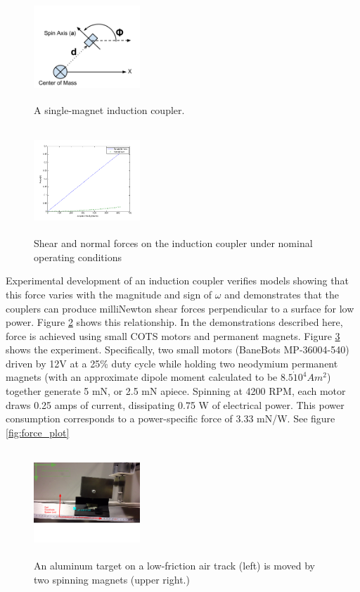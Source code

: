 \documentclass{article}
\begin{document}
\begin{figure}\label{fig:min_array_diagram}
\includegraphics[width = 4cm, height = 4cm ]{figures/minimum_array.png}

\caption{A single-magnet induction coupler.}
\end{figure}

\begin{figure}
\includegraphics[width = 4cm, height = 4cm ]{figures/tan_v_norm_force.png}

\caption{Shear and normal forces on the induction coupler under nominal operating conditions}
\label{fig:tan_v_norm_f}
\end{figure}

Experimental development of an induction coupler verifies models showing that this force varies with the magnitude and sign of $\omega$ and demonstrates that the couplers can produce milliNewton shear forces perpendicular to a surface for low power. Figure \ref{fig:tan_v_norm_f} shows this relationship. 
In the demonstrations described here, force is achieved using small COTS motors and permanent magnets. Figure \ref{fig:cart_picture} shows the experiment. Specifically, two small motors (BaneBots MP-36004-540) driven by 12V at a 25\% duty cycle while holding two neodymium permanent magnets (with an approximate dipole moment calculated to be $8.5\dot10^4 Am^2$) together generate 5 mN, or 2.5 mN apiece. Spinning at 4200 RPM, each motor draws 0.25 amps of current, dissipating 0.75 W of electrical power. 
This power consumption corresponds to a power-specific force of 3.33 mN/W. See figure \ref{fig:force_plot}

\begin{figure}
\includegraphics[width = 4cm, height = 4cm ]{figures/cart_on_track.png}

\caption{An aluminum target on a low-friction air track (left) is moved by two spinning magnets (upper right.)}
\label{fig:cart_picture}
\end{figure}
\end{document}
